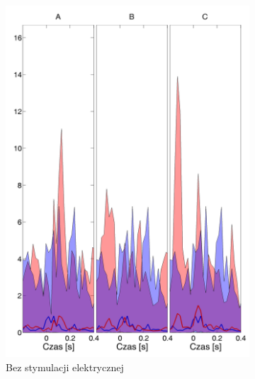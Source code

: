 \documentclass{pracamgr}
\begin{document}
	\begin{figure}[h]
		\begin{subfigure}{.5\textwidth}
			\centering
			\includegraphics[width=1.\linewidth]{kontrola15_10-30_z_CxC8_do_LGN82.png}
			\caption{Bez stymulacji elektrycznej}
			\label{rys:10_30_kon_CxC_LGN}
		\end{subfigure}%
		\begin{subfigure}{.5\textwidth}

\end{subfigure}
\end{figure}
\end{document}
